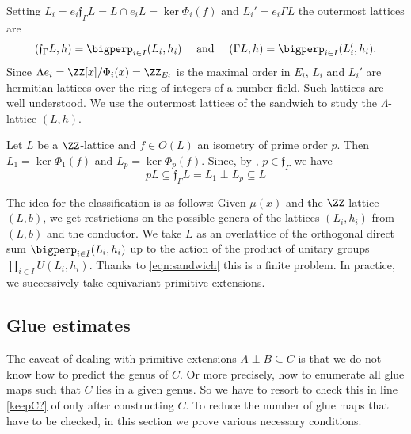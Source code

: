 Setting $L_i = e_i \mathfrak{f}_{\Gamma}  L = L \cap e_i L = \ker \Phi_i(f)$ and $L_i' = e_i  \Gamma L$ the outermost lattices are
\[(\mathfrak{f}_{\Gamma}L,h) =\bigperp_{i\in I}(L_i,h_i)\quad \text{ and } \quad
(\Gamma L,h) = \bigperp_{i\in I} (L_i',h_i).\]
Since $\Lambda e_i=\ZZ[x]/\Phi_i(x) = \ZZ_{E_i}$ is the maximal order in $E_i$, $L_i$ and $L_i'$ are hermitian lattices over the
ring of integers of a number field. Such lattices are well understood.
We use the outermost lattices of the sandwich to study the $\Lambda$-lattice $(L,h)$.
\begin{example}\label{ex:porder}
 Let $L$ be a $\ZZ$-lattice and $f\in O(L)$ an isometry of prime order $p$.
 Then $L_1 = \ker \Phi_1(f)$ and $L_p = \ker \Phi_p(f)$. Since, by , $p \in \mathfrak{f}_\Gamma$ we have
 \begin{equation}\label{index-p}
p L \subseteq \mathfrak{f}_\Gamma L= L_1 \perp L_p \subseteq L
 \end{equation}
\end{example}

%

%
%
%
%
The idea for the classification is as follows:
Given $\mu(x)$ and the $\ZZ$-lattice
$(L,b)$,
we get restrictions on the possible genera of the lattices
$(L_i,h_i)$ from $(L,b)$ and the conductor.
We take $L$ as an overlattice of the orthogonal direct sum $\bigperp_{i\in I} (L_i,h_i)$
up to the action of the product of unitary groups $\prod_{i \in I}U(L_i,h_i)$.
Thanks to \cref{eqn:sandwich}
this is a finite problem. In practice, we successively take equivariant primitive extensions.

\subsection{Glue estimates}\label{glue_estim}
The caveat of dealing with primitive extensions $A \perp B \subseteq C$ is that we do not know how to predict the genus of $C$.
Or more precisely, how to enumerate all glue maps such that $C$ lies in a given genus.
So we have to resort to check this in line \ref{keepC?} of  only after constructing $C$.
To reduce the number of glue maps that have to be checked, in this section we prove various necessary conditions.

